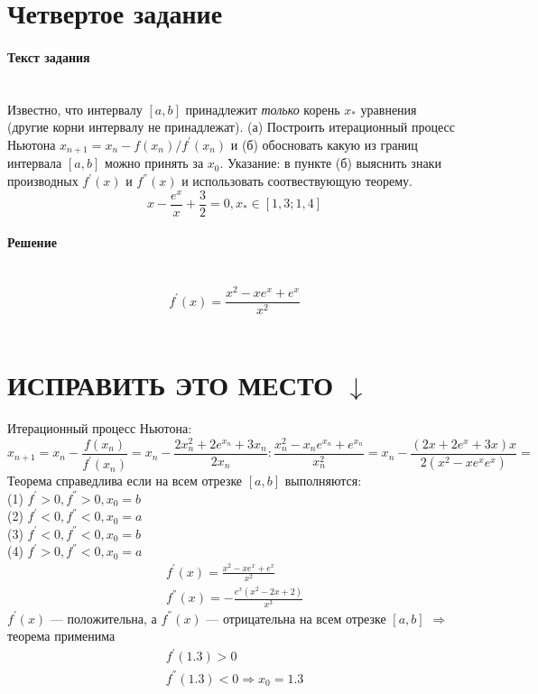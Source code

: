 \section{Четвертое задание}

\paragraph{Текст задания} ~\\
Известно, что интервалу $\left[a, b\right]$ принадлежит \textit{\textsl{только}} корень $x_{*}$ уравнения (другие корни интервалу не принадлежат). (а) Построить итерационный процесс Ньютона $x_{n+1} = x_{n} -f(x_{n})/f^{'}(x_{n})$ и (б) обосновать какую из границ интервала $\left[a, b\right]$ можно принять за $x_{0}$. Указание: в пункте (б) выяснить знаки производных $f^{'}(x)$ и $f^{''}(x)$ и использовать соотвествующую теорему.\\[3mm]
\[
  x - \frac{e^{x}}{x} + \frac{3}{2} = 0, x_{*} \in \left[1, 3; 1, 4\right]
\]

\paragraph{Решение} ~\\
\[
  f^{'}(x) = \frac{x^{2}-xe^{x}+e^{x}}{x^{2}}
\]\\[1mm]
\section{ИСПРАВИТЬ ЭТО МЕСТО $\downarrow$}
Итерационный процесс Ньютона:
\[
  x_{n+1} = x_{n} - \frac{f(x_{n})}{f^{'}(x_{n})} =x_{n} - \frac{2x_{n}^{2}+2e^{x_{n}}+3x_{n}}{2x_{n}} : \frac{x_{n}^{2}-x_{n}e^{x_{n}}+e^{x_{n}}}{x_{n}^{2}} = x_{n}- \frac{(2x+2e^{x}+3x)x}{2(x^{2}-xe^{x}e^{x})} =
\]
Теорема справедлива если на всем отрезке $\left[a, b\right]$ выполняются:\\
(1) $f^{'} > 0, f^{''} > 0, x_{0} = b$\\
(2) $f^{'} < 0, f^{''} < 0, x_{0} = a$\\
(3) $f^{'} < 0, f^{''} < 0, x_{0} = b$\\
(4) $f^{'} > 0, f^{''} < 0, x_{0} = a$\\
\begin{gather*}
  f^{'}(x) = \frac{x^{2}-xe^{x}+e^{x}}{x^{2}} \\
  f^{''}(x) = -\frac{e^{x}(x^{2}-2x+2)}{x^{3}}
\end{gather*}
$f^{'}(x)$ --- положительна, а $ f^{''}(x)$ --- отрицательна на всем отрезке $\left[a, b\right]$ $\Rightarrow$ теорема применима
\begin{gather*}
  f^{'}(1.3) > 0 \\
  f^{''}(1.3) < 0 \Rightarrow x_{0} = 1.3
\end{gather*}

